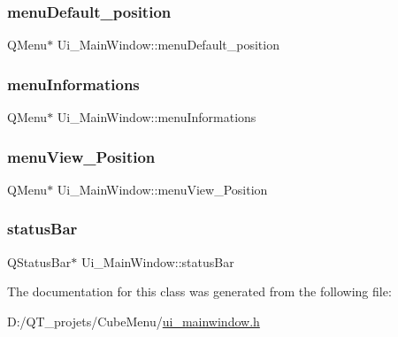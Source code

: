 \subsubsection{\texorpdfstring{menu\+Default\+\_\+position}{menuDefault\_position}}
{\footnotesize\ttfamily Q\+Menu$\ast$ Ui\+\_\+\+Main\+Window\+::menu\+Default\+\_\+position}

\hypertarget{class_ui___main_window_a349ea71defdb75b5832851ebf6acaae8}{}\label{class_ui___main_window_a349ea71defdb75b5832851ebf6acaae8} 
\subsubsection{\texorpdfstring{menu\+Informations}{menuInformations}}
{\footnotesize\ttfamily Q\+Menu$\ast$ Ui\+\_\+\+Main\+Window\+::menu\+Informations}

\hypertarget{class_ui___main_window_a2d1b019089ba5bd006a53d925168444e}{}\label{class_ui___main_window_a2d1b019089ba5bd006a53d925168444e} 
\subsubsection{\texorpdfstring{menu\+View\+\_\+\+Position}{menuView\_Position}}
{\footnotesize\ttfamily Q\+Menu$\ast$ Ui\+\_\+\+Main\+Window\+::menu\+View\+\_\+\+Position}

\hypertarget{class_ui___main_window_a50fa481337604bcc8bf68de18ab16ecd}{}\label{class_ui___main_window_a50fa481337604bcc8bf68de18ab16ecd} 
\subsubsection{\texorpdfstring{status\+Bar}{statusBar}}
{\footnotesize\ttfamily Q\+Status\+Bar$\ast$ Ui\+\_\+\+Main\+Window\+::status\+Bar}



The documentation for this class was generated from the following file\+:\begin{DoxyCompactItemize}
\item 
D\+:/\+Q\+T\+\_\+projets/\+Cube\+Menu/\hyperlink{ui__mainwindow_8h}{ui\+\_\+mainwindow.\+h}\end{DoxyCompactItemize}

